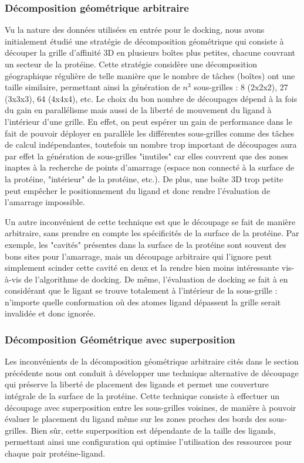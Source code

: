 \subsubsection{Décomposition géométrique arbitraire}
Vu la nature des données utilisées en entrée pour le docking, nous avons initialement étudié une stratégie de décomposition géométrique qui consiste à découper la grille d'affinité 3D en plusieurs boîtes plus petites, chacune couvrant un secteur de la protéine. Cette stratégie considère une décomposition géographique régulière de telle manière que le nombre de tâches (boîtes) ont une taille similaire, permettant ainsi la génération de $n^3$ sous-grilles : 8 (2x2x2), 27 (3x3x3), 64 (4x4x4), etc. Le choix du bon nombre de découpages dépend à la fois du gain  en parallélisme mais aussi de la liberté de mouvement du ligand à l'intérieur d'une grille. 
En effet, on peut espérer un gain de performance dans le fait de pouvoir déployer en parallèle les différentes sous-grilles comme des tâches de calcul indépendantes, toutefois un nombre trop important de découpages aura par effet la génération de sous-grilles "inutiles" car elles couvrent que des zones inaptes à la recherche de points d'amarrage (espace non connecté à la surface de la protéine, "intérieur" de la protéine, etc.). De plus, une boîte 3D trop petite peut empêcher le positionnement du ligand et donc rendre l'évaluation de l'amarrage impossible.

Un autre inconvénient de cette technique est que le découpage se fait de manière arbitraire, sans prendre en compte les spécificités de la surface de la protéine. Par exemple, les "cavités" présentes dans la surface de la protéine sont souvent des bons sites pour l'amarrage, mais un découpage arbitraire qui l'ignore peut simplement scinder cette cavité en deux et la rendre bien moins intéressante vis-à-vis de l'algorithme de docking. De même, l'évaluation de docking se fait à en considérant que le ligant se trouve totalement à l'intérieur de la sous-grille : n'importe quelle conformation où des atomes ligand dépassent la grille serait invalidée et donc ignorée. 

\subsubsection{Décomposition Géométrique avec superposition}
Les inconvénients de la décomposition géométrique arbitraire cités dans le section précédente nous ont conduit à développer une technique alternative de découpage qui préserve la liberté de placement des ligands et permet une couverture intégrale de la surface de la protéine. Cette technique consiste à effectuer un découpage avec superposition entre les sous-grilles voisines, de manière à pouvoir évaluer le placement du ligand même sur les zones proches des bords des sous-grilles. Bien sûr, cette superposition est dépendante de la taille des ligands, permettant ainsi une configuration qui optimise l'utilisation des ressources pour chaque pair protéine-ligand. 

